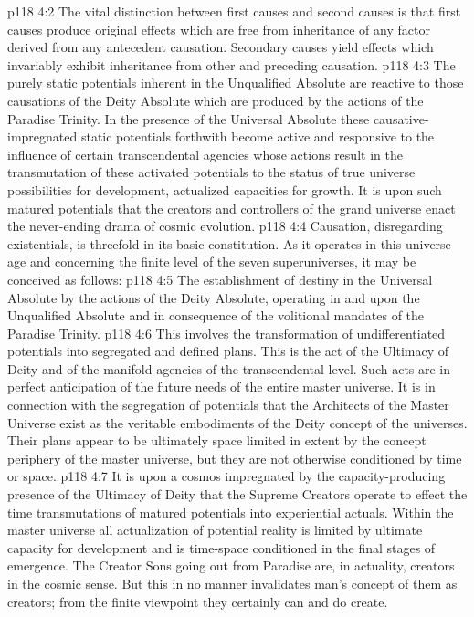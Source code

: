 \vs p118 4:2 The vital distinction between first causes and second causes is that first causes produce original effects which are free from inheritance of any factor derived from any antecedent causation. Secondary causes yield effects which invariably exhibit inheritance from other and preceding causation.
\pc \vs p118 4:3 The purely static potentials inherent in the Unqualified Absolute are reactive to those causations of the Deity Absolute which are produced by the actions of the Paradise Trinity. In the presence of the Universal Absolute these causative\hyp{}impregnated static potentials forthwith become active and responsive to the influence of certain transcendental agencies whose actions result in the transmutation of these activated potentials to the status of true universe possibilities for development, actualized capacities for growth. It is upon such matured potentials that the creators and controllers of the grand universe enact the never\hyp{}ending drama of cosmic evolution.
\vs p118 4:4 Causation, disregarding existentials, is threefold in its basic constitution. As it operates in this universe age and concerning the finite level of the seven superuniverses, it may be conceived as follows:
\pc \vs p118 4:5 \bibnobreakspace {} The establishment of destiny in the Universal Absolute by the actions of the Deity Absolute, operating in and upon the Unqualified Absolute and in consequence of the volitional mandates of the Paradise Trinity.
\pc \vs p118 4:6 \bibnobreakspace {} This involves the transformation of undifferentiated potentials into segregated and defined plans. This is the act of the Ultimacy of Deity and of the manifold agencies of the transcendental level. Such acts are in perfect anticipation of the future needs of the entire master universe. It is in connection with the segregation of potentials that the Architects of the Master Universe exist as the veritable embodiments of the Deity concept of the universes. Their plans appear to be ultimately space limited in extent by the concept periphery of the master universe, but  they are not otherwise conditioned by time or space.
\pc \vs p118 4:7 \bibnobreakspace {} It is upon a cosmos impregnated by the capacity\hyp{}producing presence of the Ultimacy of Deity that the Supreme Creators operate to effect the time transmutations of matured potentials into experiential actuals. Within the master universe all actualization of potential reality is limited by ultimate capacity for development and is time\hyp{}space conditioned in the final stages of emergence. The Creator Sons going out from Paradise are, in actuality,  creators in the cosmic sense. But this in no manner invalidates man’s concept of them as creators; from the finite viewpoint they certainly can and do create.
